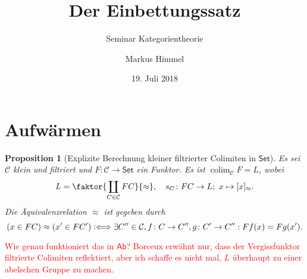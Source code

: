 \documentclass[a4paper, parskip=half]{scrartcl}
\subtitle{Seminar Kategorientheorie}
\title{Der Einbettungssatz}
\author{Markus Himmel}
\date{19. Juli 2018}
\theoremstyle{marginbreak}
\newtheorem{proposition}[remark]{Proposition}
\theoremstyle{nonumberplain}
\newcommand{\defiff}{\mathrel{\vcentcolon\Longleftrightarrow}}
\newcommand\ccat\mathsf
\newcommand\cat\mathcal
\DeclareMathOperator{\colim}{colim}
\begin{document}
	\maketitle
	\setcounter{section}{-1}

	\section{Aufwärmen}
		\begin{proposition}[Explizite Berechnung kleiner filtrierter Colimiten in $\ccat{Set}$]\label{2-13-3}
			Es sei $\cat{C}$ klein und filtriert und $F\colon \cat{C}\to\ccat{Set}$ ein
			Funktor. Es ist $\colim_\cat{C} F = L$, wobei
			\[
				L=\faktor{\coprod_{C\in\cat{C}}FC}{\approx},\quad s_C\colon FC\to L;\ x\mapsto [x]_\approx.
			\]
			Die Äquivalenzrelation $\approx$ ist gegeben durch
			\[
				(x\in FC) \approx (x'\in FC') \defiff \exists C''\in\cat{C}, f\colon C\to C'', g\colon C'\to C'': Ff(x) = Fg(x').
			\]
		\end{proposition}
		\textcolor{red}{Wie genau funktioniert das in $\ccat{Ab}$? Borceux erwähnt nur,
			dass der Vergissfunktor filtrierte Colimiten reflektiert, aber ich schaffe
			es nicht mal, $L$ überhaupt zu einer abelschen Gruppe zu machen.}
\end{document}
